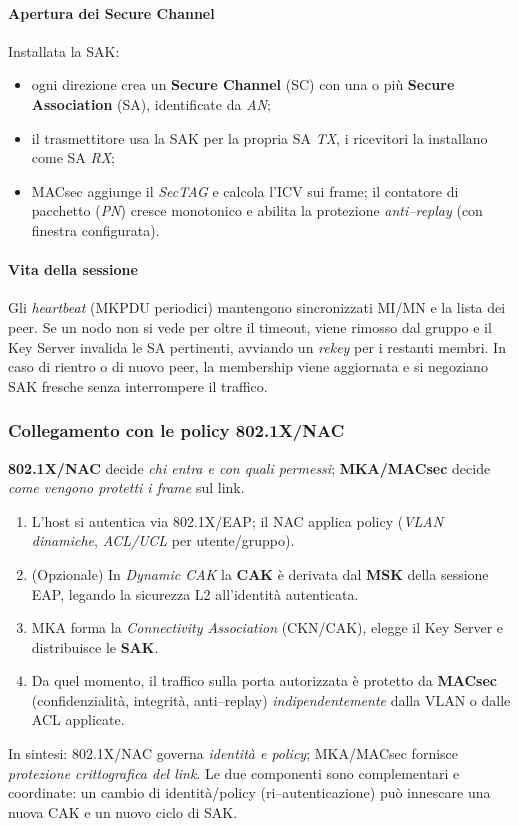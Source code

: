 \paragraph{Apertura dei Secure Channel}
Installata la SAK:
\begin{itemize}
  \item ogni direzione crea un \textbf{Secure Channel} (SC) con una o pi\`u \textbf{Secure Association} (SA), identificate da \emph{AN};
  \item il trasmettitore usa la SAK per la propria SA \emph{TX}, i ricevitori la installano come SA \emph{RX};
  \item MACsec aggiunge il \emph{SecTAG} e calcola l'ICV sui frame; il contatore di pacchetto (\emph{PN}) cresce monotonico e abilita la protezione \emph{anti–replay} (con finestra configurata).
\end{itemize}

\paragraph{Vita della sessione}
Gli \emph{heartbeat} (MKPDU periodici) mantengono sincronizzati MI/MN e la lista dei peer. Se un nodo non si vede per oltre il timeout, viene rimosso dal gruppo e il Key Server invalida le SA pertinenti, avviando un \emph{rekey} per i restanti membri. In caso di rientro o di nuovo peer, la membership viene aggiornata e si negoziano SAK fresche senza interrompere il traffico.

\subsubsection{Collegamento con le policy 802.1X/NAC}
\textbf{802.1X/NAC} decide \emph{chi entra e con quali permessi}; \textbf{MKA/MACsec} decide \emph{come vengono protetti i frame} sul link.
\begin{enumerate}
  \item L'host si autentica via 802.1X/EAP; il NAC applica policy (\emph{VLAN dinamiche}, \emph{ACL/UCL} per utente/gruppo).
  \item (Opzionale) In \emph{Dynamic CAK} la \textbf{CAK} è derivata dal \textbf{MSK} della sessione EAP, legando la sicurezza L2 all'identit\`a autenticata.
  \item MKA forma la \emph{Connectivity Association} (CKN/CAK), elegge il Key Server e distribuisce le \textbf{SAK}.
  \item Da quel momento, il traffico sulla porta autorizzata è protetto da \textbf{MACsec} (confidenzialit\`a, integrit\`a, anti–replay) \emph{indipendentemente} dalla VLAN o dalle ACL applicate.
\end{enumerate}
In sintesi: 802.1X/NAC governa \emph{identit\`a e policy}; MKA/MACsec fornisce \emph{protezione crittografica del link}. Le due componenti sono complementari e coordinate: un cambio di identit\`a/policy (ri–autenticazione) pu\`o innescare una nuova CAK e un nuovo ciclo di SAK.



